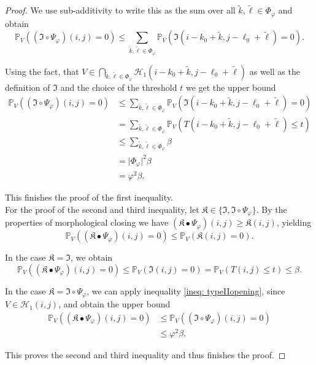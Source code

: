 \documentclass[a4paper,12pt]{article}
\newcommand{\abs}[1]{\lvert#1\rvert}
\theoremstyle{plain}
\theoremstyle{definition}
\numberwithin{equation}{section}
\begin{document}
\begin{proof}
	We use sub-additivity to write this as the sum over all $\tilde{k}, \tilde{\ell} \in \Phi_\varphi$ and obtain
	\begin{equation*}
		\mathbb{P}_V\left( (\mathfrak{I} \circ \Psi_\varphi)(i, j) = 0 \right) \leq \sum_{\tilde{k}, \tilde{\ell} \in \Phi_\varphi} \mathbb{P}_V\left( \mathfrak{I}(i - k_0 + \tilde{k}, j - \ell_0 + \tilde{\ell}) = 0 \right).
	\end{equation*}
	
	Using the fact, that $V \in \bigcap_{\tilde{k}, \tilde{\ell} \in \Phi_\varphi} \mathcal{H}_1(i - k_0 + \tilde{k}, j - \ell_0 + \tilde{\ell})$ as well as the definition of $\mathfrak{I}$ and the choice of the threshold $t$ we get the upper bound
	\begin{align*}
		\mathbb{P}_V\left( (\mathfrak{I} \circ \Psi_\varphi)(i, j) = 0 \right) &\leq \sum_{\tilde{k}, \tilde{\ell} \in \Phi_\varphi} \mathbb{P}_V\left( \mathfrak{I}(i - k_0 + \tilde{k}, j - \ell_0 + \tilde{\ell}) = 0 \right) \\
		&= \sum_{\tilde{k}, \tilde{\ell} \in \Phi_\varphi} \mathbb{P}_V\left( T(i - k_0 + \tilde{k}, j - \ell_0 + \tilde{\ell}) \leq t \right) \\
		&\leq \sum_{\tilde{k}, \tilde{\ell} \in \Phi_\varphi} \beta \\
		&= \abs{\Phi_\varphi}^2 \beta \\
		&= \varphi^2 \beta.
	\end{align*}
	
	This finishes the proof of the first inequality.\\
	
	
	For the proof of the second and third inequality, let $\mathfrak{K} \in \{ \mathfrak{I}, \mathfrak{I} \circ \Psi_\varphi \}$. By the properties of morphological closing we have $(\mathfrak{K} \bullet \Psi_\varphi)(i, j) \geq \mathfrak{K}(i, j)$, yielding
	\begin{equation*}
		\mathbb{P}_V\left( (\mathfrak{K} \bullet \Psi_\varphi)(i, j) = 0 \right) \leq \mathbb{P}_V\left( \mathfrak{K}(i, j) = 0 \right).
	\end{equation*}
	
	In the case $\mathfrak{K} = \mathfrak{I}$, we obtain
	\begin{equation*}
		\mathbb{P}_V\left( (\mathfrak{K} \bullet \Psi_\varphi)(i, j) = 0 \right) \leq \mathbb{P}_V\left( \mathfrak{I}(i, j) = 0 \right) = \mathbb{P}_V\left( T(i, j) \leq t \right) \leq \beta.
	\end{equation*}
	
	In the case $\mathfrak{K} = \mathfrak{I} \circ \Psi_\varphi$, we can apply inequality \eqref{ineq: typeIIopening}, since $V \in \mathcal{H}_1(i, j)$, and obtain the upper bound
	\begin{align*}
		\mathbb{P}_V\left( (\mathfrak{K} \bullet \Psi_\varphi)(i, j) = 0 \right) &\leq \mathbb{P}_V\left( (\mathfrak{I} \circ \Psi_\varphi)(i, j) = 0 \right) \\
		&\leq \varphi^2 \beta.
	\end{align*}
	
	This proves the second and third inequality and thus finishes the proof.
\end{proof}
\end{document}
